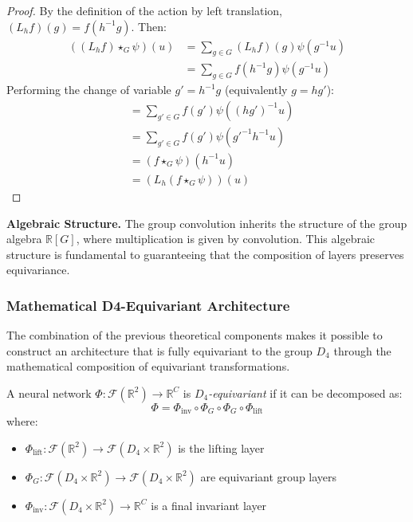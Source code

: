 \begin{proof}
By the definition of the action by left translation, $(L_h f)(g) = f(h^{-1}g)$. Then:
\begin{align}
((L_h f) \star_G \psi)(u) &= \sum_{g \in G} (L_h f)(g) \psi(g^{-1}u) \\
&= \sum_{g \in G} f(h^{-1}g) \psi(g^{-1}u)
\end{align}
Performing the change of variable $g' = h^{-1}g$ (equivalently $g = hg'$):
\begin{align}
&= \sum_{g' \in G} f(g') \psi((hg')^{-1}u) \\
&= \sum_{g' \in G} f(g') \psi(g'^{-1}h^{-1}u) \\
&= (f \star_G \psi)(h^{-1}u) \\
&= (L_h (f \star_G \psi))(u)
\end{align}
\end{proof}

\textbf{Algebraic Structure.} The group convolution inherits the structure of the group algebra $\mathbb{R}[G]$, where multiplication is given by convolution. This algebraic structure is fundamental to guaranteeing that the composition of layers preserves equivariance.

\subsubsection{Mathematical D4-Equivariant Architecture}\label{subsubsec:arquitectura_d4_matematica}

The combination of the previous theoretical components makes it possible to construct an architecture that is fully equivariant to the group $D_4$ through the mathematical composition of equivariant transformations.

\begin{definition}\label{def:red_d4_equivariante}
A neural network $\Phi: \mathcal{F}(\mathbb{R}^2) \to \mathbb{R}^C$ is \textit{$D_4$-equivariant} if it can be decomposed as:
\begin{equation}
\Phi = \Phi_{\text{inv}} \circ \Phi_{G} \circ \Phi_{G} \circ \Phi_{\text{lift}}
\end{equation}
where:
\begin{itemize}
    \item $\Phi_{\text{lift}}: \mathcal{F}(\mathbb{R}^2) \to \mathcal{F}(D_4 \times \mathbb{R}^2)$ is the lifting layer
    \item $\Phi_{G}: \mathcal{F}(D_4 \times \mathbb{R}^2) \to \mathcal{F}(D_4 \times \mathbb{R}^2)$ are equivariant group layers
    \item $\Phi_{\text{inv}}: \mathcal{F}(D_4 \times \mathbb{R}^2) \to \mathbb{R}^C$ is a final invariant layer
\end{itemize}
\end{definition}

